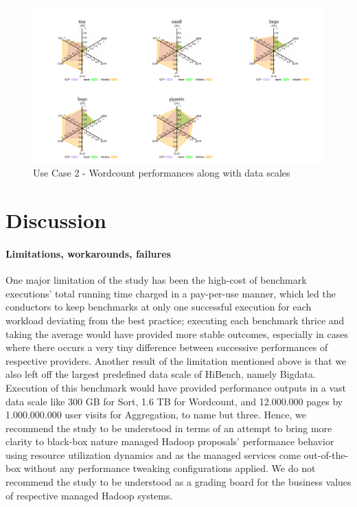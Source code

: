 \documentclass[review]{elsarticle}
\begin{document}
\begin{figure}[p]
	\caption{Use Case 2 - Wordcount performances along with data scales}
	\label{fig:uc2-wrdcnt-new}
	\includegraphics[width=\textwidth]{uc2-wrdcnt-new}
	\centering
\end{figure}



\section{Discussion}
\paragraph{Limitations, workarounds, failures}One major limitation of the study has been the high-cost of benchmark executions' total running time charged in a pay-per-use manner, which led the conductors to keep benchmarks at only one successful execution for each workload deviating from the best practice; executing each benchmark thrice and taking the average would have provided more stable outcomes, especially in cases where there occurs a very tiny difference between successive performances of respective providers. Another result of the  limitation mentioned above is that we also left off the largest predefined data scale of HiBench, namely Bigdata. Execution of this benchmark would have provided performance outputs in a vast data scale like 300 GB for Sort, 1.6 TB for Wordcount, and 12.000.000 pages by 1.000.000.000 user visits for Aggregation, to name but three. Hence, we recommend the study to be understood in terms of an attempt to bring more clarity to black-box nature managed Hadoop proposals' performance behavior using resource utilization dynamics and as the managed services come out-of-the-box without any performance tweaking configurations applied. We do not recommend the study to be understood as a grading board for the business values of respective managed Hadoop systems.
\end{document}
